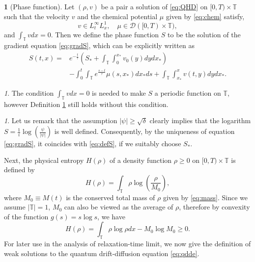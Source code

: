 \documentclass[leqno]{amsart}
\theoremstyle{plain}
\theoremstyle{definition}
\newtheorem{defn}[thm]{\protect\definitionname}
\theoremstyle{remark}
\newtheorem{rem}[thm]{\protect\remarkname}
\theoremstyle{plain}
\theoremstyle{plain}
\providecommand{\definitionname}{Definition}
\providecommand{\remarkname}{Remark}
\def\T{{\mathbb T}}%
\numberwithin{equation}{section}
\begin{document}
\begin{defn}[Phase function]\label{def:phase}
Let $(\rho,v)$ be a pair a solution of \eqref{eq:QHD} on $[0,T)\times\T$ such that the velocity $v$ and the chemical potential $\mu$ given by \eqref{eq:chem} satisfy, 
\[
v\in L^\infty_tL^1_x,\quad\mu\in \mathcal{D}([0,T)\times\T),
\]
and $\int_\T v dx=0$. Then we define the phase function $S$ to be the solution of the gradient equation \eqref{eq:gradS}, which can be explicitly written as
\begin{equation}\label{eq:defS}
\begin{aligned}
S(t,x)=&e^{-\frac{t}{\tau}} \left(S_*+\int_\T\int_0^{x_*}v_0(y)dydx_*\right)\\
&-\int_0^t \int_\T e^{\frac{s-t}{\tau}}\mu(s,x_*)dx_*ds+\int_\T\int_{x_*}^x v(t,y)dydx_*.
\end{aligned}
\end{equation}
\end{defn}

\begin{rem}
The condition $\int_\T v dx=0$ is needed to make $S$ a periodic function on $\T$, however Definition \ref{def:phase} still holds without this condition.
\end{rem}

\begin{rem}\label{rem:equivS}
Let us remark that the assumption $|\psi|\geq\sqrt{\delta}$ clearly implies that the logarithm $S=\frac{1}{i}\log\left(\frac{\psi}{|\psi|}\right)$ is well defined. Consequently, by the uniqueness of equation \eqref{eq:gradS}, it coincides with \eqref{eq:defS}, if we suitably choose $S_*$.
\end{rem}


Next, the physical entropy $H(\rho)$ of a density function $\rho\geq 0$ on $[0,T)\times\T$ is defined by
\begin{equation*}
H(\rho)=\int_\T\rho\log\left(\frac{\rho}{M_0}\right),
\end{equation*}
where $M_0\equiv M(t)$ is the conserved total mass of $\rho$ given by \eqref{eq:mass}. Since we assume $|\T|=1$, $M_0$ can also be viewed as the average of $\rho$, therefore by convexity of the function $g(s)=s\log s$, we have 
\[
H(\rho)=\int_\T \rho\log\rho dx-M_0\log M_0\geq 0.
\]
For later use in the analysis of relaxation-time limit, we now give the definition of weak solutions to the quantum drift-diffusion equation \eqref{eq:qdde}.
\end{document}
